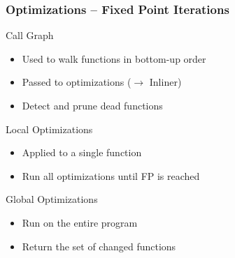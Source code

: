 \documentclass[navbaroff,en]{sdqbeamer}
\begin{document}
\begin{frame}
    \frametitle{Optimizations -- Fixed Point Iterations}

	\begin{contentblock}{Call Graph}
		\begin{itemize}
			\item Used to walk functions in bottom-up order
			\item Passed to optimizations ($\rightarrow$ Inliner)
			\item Detect and prune dead functions
		\end{itemize}
	\end{contentblock}

	\begin{contentblock}{Local Optimizations}
		\begin{itemize}
			\item Applied to a single function
			\item Run all optimizations until FP is reached
		\end{itemize}
	\end{contentblock}

	\begin{contentblock}{Global Optimizations}
		\begin{itemize}
			\item Run on the entire program
			\item Return the set of changed functions
		\end{itemize}
	\end{contentblock}

\end{frame}
\end{document}
